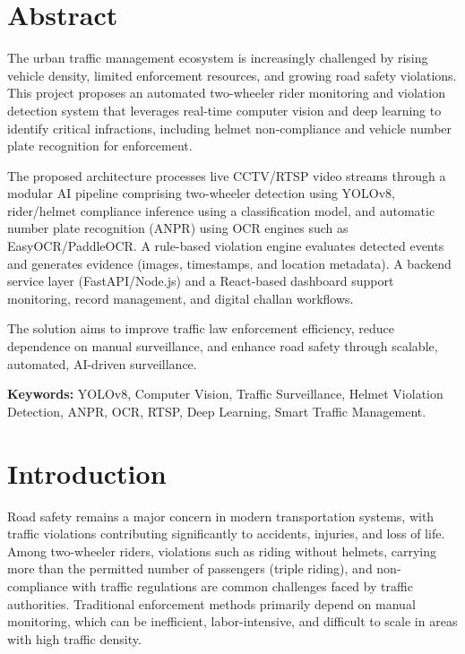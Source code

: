 \documentclass[12pt,a4paper]{article}
\begin{document}
\section*{Abstract}
The urban traffic management ecosystem is increasingly challenged by rising vehicle density, limited enforcement resources, and growing road safety violations. This project proposes an automated two-wheeler rider monitoring and violation detection system that leverages real-time computer vision and deep learning to identify critical infractions, including helmet non-compliance and vehicle number plate recognition for enforcement.

The proposed architecture processes live CCTV/RTSP video streams through a modular AI pipeline comprising two-wheeler detection using YOLOv8, rider/helmet compliance inference using a classification model, and automatic number plate recognition (ANPR) using OCR engines such as EasyOCR/PaddleOCR. A rule-based violation engine evaluates detected events and generates evidence (images, timestamps, and location metadata). A backend service layer (FastAPI/Node.js) and a React-based dashboard support monitoring, record management, and digital challan workflows.

The solution aims to improve traffic law enforcement efficiency, reduce dependence on manual surveillance, and enhance road safety through scalable, automated, AI-driven surveillance.

\vspace{0.3cm}
\textbf{Keywords:} YOLOv8, Computer Vision, Traffic Surveillance, Helmet Violation Detection, ANPR, OCR, RTSP, Deep Learning, Smart Traffic Management.

\newpage
\tableofcontents

\newpage
\listoffigures

\newpage
\listoftables

\newpage
{}


\section{Introduction}
Road safety remains a major concern in modern transportation systems, with traffic violations contributing significantly to accidents, injuries, and loss of life. Among two-wheeler riders, violations such as riding without helmets, carrying more than the permitted number of passengers (triple riding), and non-compliance with traffic regulations are common challenges faced by traffic authorities. Traditional enforcement methods primarily depend on manual monitoring, which can be inefficient, labor-intensive, and difficult to scale in areas with high traffic density.
\end{document}
